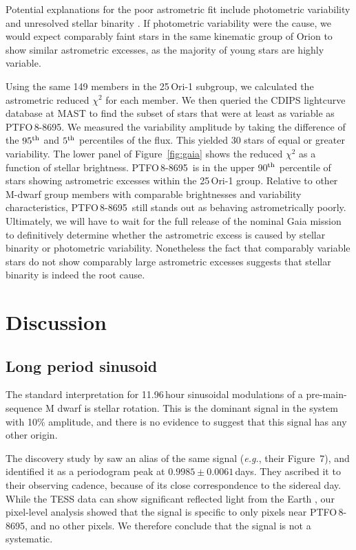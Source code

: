 \documentclass[12pt,twocolumn,tighten]{aastex62}
\newcommand{\ptfo}{PTFO$\,$8-8695}
\begin{document}
Potential explanations for the poor astrometric fit include
photometric variability and unresolved stellar binarity \citep[{\it
e.g.},][]{rizzuto_ZEIT8_2018,belokurov_unresolved_2020}.  If
photometric variability were the cause, we would expect comparably
faint stars in the same kinematic group of Orion to show similar
astrometric excesses, as the majority of young stars are highly
variable.

Using the same 149 members in the 25$\,$Ori-1 subgroup, we calculated
the astrometric reduced $\chi^2$ for each member.  We then queried the
CDIPS lightcurve database at MAST \citep{bouma_cluster_2019} to find
the subset of stars that were at least as variable as \ptfo.
We measured the variability amplitude by taking the difference of the
$95^{\rm th}$ and $5^{\rm th}$ percentiles of the flux.
This yielded 30 stars of equal or greater variability.
The lower panel of Figure~\ref{fig:gaia} shows the
reduced $\chi^2$ as a function of stellar brightness.  \ptfo\ is in
the upper 90$^{\rm th}$ percentile of stars showing astrometric
excesses within the 25$\,$Ori-1 group.  Relative to other M-dwarf
group members with comparable brightnesses and variability
characteristics, \ptfo\ still stands out as behaving astrometrically
poorly.  Ultimately, we will have to wait for the full release of the
nominal Gaia mission to definitively determine whether the astrometric
excess is caused by stellar binarity or photometric variability.
Nonetheless the fact that comparably variable stars do not show
comparably large astrometric excesses suggests that stellar binarity
is indeed the root cause.


\section{Discussion}
\label{sec:discussion}

\subsection{Long period sinusoid}

The standard interpretation for 11.96$\,$hour sinusoidal modulations
of a pre-main-sequence M dwarf is stellar rotation.  This is the
dominant signal in the system with 10\% amplitude, and there is no
evidence to suggest that this signal has any other origin.

The discovery study by \citet{van_eyken_ptf_2012} saw an alias of the
same signal ({\it e.g.}, their Figure~7), and identified it as a
periodogram peak at $0.9985 \pm 0.0061\,$days. They ascribed it to
their observing cadence, because of its close correspondence to the
sidereal day.  While the TESS data can show significant reflected
light from the Earth \citep[{\it e.g.},][]{luger_tess_2019}, our
pixel-level analysis showed that the signal is specific to only pixels
near \ptfo, and no other pixels.  We therefore conclude that the
signal is not a systematic.
\end{document}

